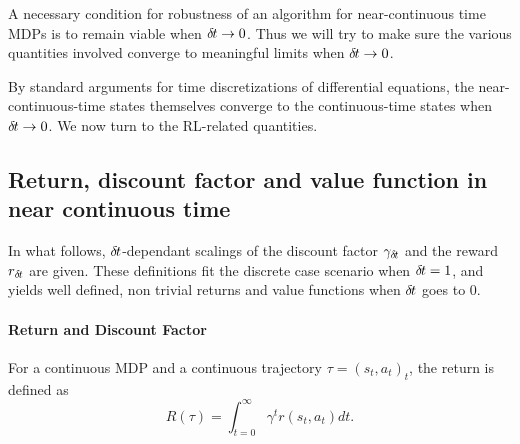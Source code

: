 A necessary condition for robustness of an algorithm for
near-continuous time MDPs is 
to remain viable when ${\delta\hspace{-.1em}t} \rightarrow 0$. Thus we will try to
make sure the various quantities involved converge to meaningful
limits when ${\delta\hspace{-.1em}t}\to 0$.

By standard arguments for time discretizations of differential
equations, the near-continuous-time states themselves converge to the
continuous-time states when ${\delta\hspace{-.1em}t}\to 0$.  We now turn to the RL-related quantities.

% 
      

\subsection{Return, discount factor and value function in near continuous time}
\label{sec:ret-gamma-v}



In what follows, ${\delta\hspace{-.1em}t}$-dependant scalings of the discount factor $\gamma_{\delta\hspace{-.1em}t}$
and the reward $r_{\delta\hspace{-.1em}t}$ are given. These definitions fit the discrete case
scenario when ${\delta\hspace{-.1em}t}=1$, and yields well defined, non trivial returns
and value functions when ${\delta\hspace{-.1em}t}$ goes to $0$.

\paragraph{Return and Discount Factor}
For a continuous MDP and a continuous trajectory $\tau = (s_t, a_t)_t$,
the return is defined as~\cite{cont_rl}
\begin{equation}
\label{eq:continuous-return}
R(\tau) = \int_{t=0}^\infty\gamma^tr(s_t, a_t)dt.
\end{equation}

